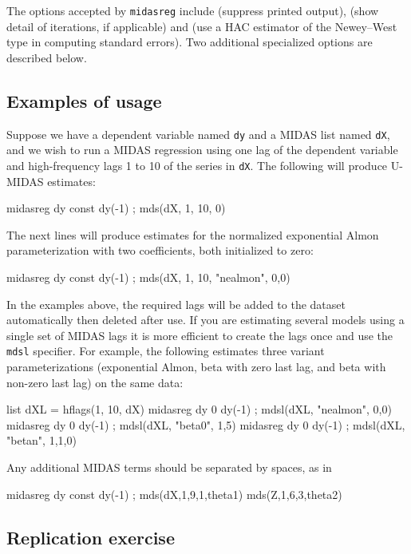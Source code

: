 \documentclass{article}
\begin{document}
The options accepted by \texttt{midasreg} include 
(suppress printed output),  (show detail of
iterations, if applicable) and  (use a HAC estimator of
the Newey--West type in computing standard errors).  Two additional
specialized options are described below.

\subsection{Examples of usage}

Suppose we have a dependent variable named \texttt{dy} and a MIDAS
list named \texttt{dX}, and we wish to run a MIDAS regression using
one lag of the dependent variable and high-frequency lags 1 to 10 of
the series in \texttt{dX}. The following will produce U-MIDAS
estimates:
%
\begin{code}
midasreg dy const dy(-1) ; mds(dX, 1, 10, 0)
\end{code}
%
The next lines will produce estimates for the normalized exponential
Almon parameterization with two coefficients, both initialized to
zero:
%
\begin{code}
midasreg dy const dy(-1) ; mds(dX, 1, 10, "nealmon", {0,0})
\end{code}
%
In the examples above, the required lags will be added to the dataset
automatically then deleted after use. If you are estimating several
models using a single set of MIDAS lags it is more efficient to create
the lags once and use the \texttt{mdsl} specifier.  For example, the
following estimates three variant parameterizations (exponential
Almon, beta with zero last lag, and beta with non-zero last lag) on
the same data:
\begin{code}
list dXL = hflags(1, 10, dX)
midasreg dy 0 dy(-1) ; mdsl(dXL, "nealmon", {0,0})
midasreg dy 0 dy(-1) ; mdsl(dXL, "beta0", {1,5})
midasreg dy 0 dy(-1) ; mdsl(dXL, "betan", {1,1,0})
\end{code}

Any additional MIDAS terms should be separated by spaces, as in
\begin{code}
midasreg dy const dy(-1) ; mds(dX,1,9,1,theta1) mds(Z,1,6,3,theta2)
\end{code}

\subsection{Replication exercise}
\end{document}
